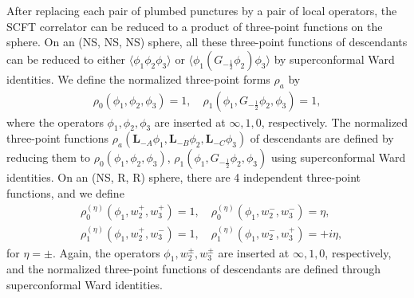\documentclass[aps,10pt,twocolumn,superscriptaddress]{revtex4-2}
\def\ie{\begin{equation}\begin{aligned}}
\def\fe{\end{aligned}\end{equation}}
\begin{document}
After replacing each pair of plumbed punctures by a pair of local operators, the SCFT correlator can be reduced to a product of three-point functions on the sphere. On an (NS, NS, NS) sphere, all these three-point functions of descendants can be reduced to either $\langle \phi_1 \phi_2 \phi_3\rangle $ or $\langle \phi_1 (G_{-\frac{1}{2}}\phi_2) \phi_3\rangle $ by superconformal Ward identities. We define the normalized three-point forms $\rho_a$ by
\ie
\rho_0(\phi_1, \phi_2, \phi_3)=1,\quad \rho_1(\phi_1, G_{-\frac{1}{2}}\phi_2, \phi_3)=1,
\fe
where the operators $\phi_1, \phi_2, \phi_3$ are inserted at $\infty, 1, 0$, respectively. The normalized three-point functions $\rho_a(\mathbf{L}_{-A}\phi_1, \mathbf{L}_{-B}\phi_2,\mathbf{L}_{-C}\phi_3)$ of descendants are defined by reducing them to $\rho_0(\phi_1, \phi_2, \phi_3)$, $\rho_1(\phi_1, G_{-\frac{1}{2}}\phi_2, \phi_3)$ using superconformal Ward identities. On an (NS, R, R) sphere, there are 4 independent three-point functions, and we define 
\ie
&\rho^{(\eta)}_0(\phi_1, w^+_2, w_3^+) = 1,\quad \rho^{(\eta)}_0(\phi_1, w^-_2, w_3^-) = \eta,\\
&\rho^{(\eta)}_1(\phi_1, w^+_2, w_3^-) = 1,\quad \rho^{(\eta)}_1(\phi_1, w^-_2, w_3^+) = +i\eta,
\fe
for $\eta = \pm$. Again, the operators $\phi_1, w_2^\pm, w_3^\pm$ are inserted at $\infty, 1, 0$, respectively, and the normalized three-point functions of descendants are defined through superconformal Ward identities. 
\end{document}

